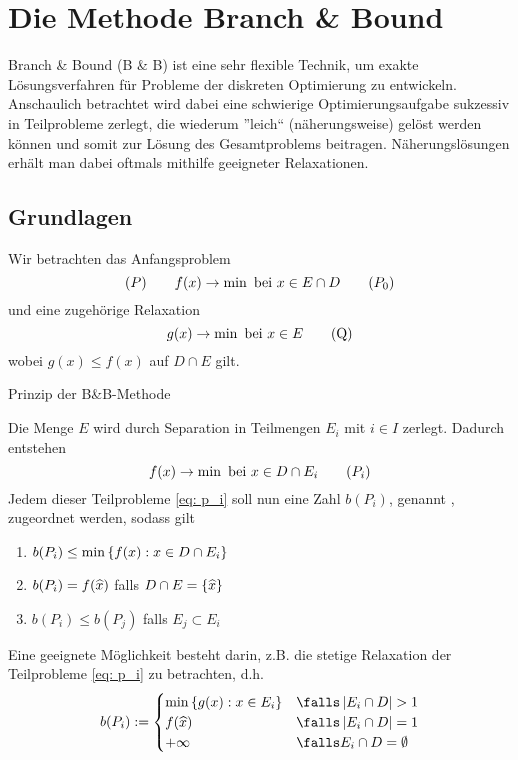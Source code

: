 \section{Die Methode Branch \& Bound}

Branch \& Bound (B \& B) ist eine sehr flexible Technik, um exakte Lösungsverfahren für Probleme der diskreten Optimierung zu entwickeln. Anschaulich betrachtet wird dabei eine schwierige Optimierungsaufgabe sukzessiv in Teilprobleme zerlegt, die wiederum ''leich`` (näherungsweise) gelöst werden können und somit zur Lösung des Gesamtproblems beitragen. Näherungslösungen erhält man dabei oftmals mithilfe geeigneter Relaxationen.

\subsection{Grundlagen}

Wir betrachten das Anfangsproblem
\begin{equation*}
	(P) \qquad f(x) \to \min \text{ bei } x \in E \cap D
	\tag{$P_0$}
	\label{eq: p_0}
\end{equation*}
und eine zugehörige Relaxation
\begin{equation*}
	g(x) \to \min \text{ bei } x \in E
	\tag{Q}
	\label{eq: q}
\end{equation*}
wobei $g(x) \le f(x)$ auf $D \cap E$ gilt.

Prinzip der B\&B-Methode

Die Menge $E$ wird durch Separation in Teilmengen $E_i$ mit $i \in I$ zerlegt. Dadurch entstehen  
\begin{equation*}
	f(x) \to \min \text{ bei } x \in D \cap E_i
	\tag{$P_i$}
	\label{eq: p_i}
\end{equation*}
Jedem dieser Teilprobleme \eqref{eq: p_i} soll nun eine Zahl $b(P_i)$, genannt , zugeordnet werden, sodass gilt
\begin{enumerate}[label=(\alph*), nolistsep]
	\item $b(P_i) \le \min\left\{ f(x) : x \in D \cap E_i \right\}$
	\item $b(P_i) = f(\widehat{x})$ falls $D \cap E = \left\{ \widehat{x} \right\}$
	\item $b(P_i) \le b(P_j)$ falls $E_j \subset E_i$
\end{enumerate}

Eine geeignete Möglichkeit besteht darin, z.B. die stetige Relaxation der Teilprobleme \eqref{eq: p_i} zu betrachten, d.h. 
\begin{equation*}
	b(P_i) \defeq \begin{cases}
	\min\menge{g(x) : x \in E_i} & \falls \card{E_i \cap D} > 1 \\
	f(\dach{x}) & \falls \card{E_i \cap D} = 1 \\
	+ \infty & \falls E_i \cap D = \emptyset
	\end{cases}
\end{equation*}

